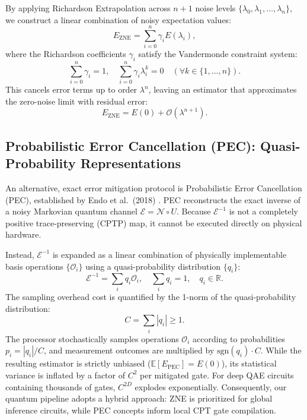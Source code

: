 By applying Richardson Extrapolation across $n+1$ noise levels $\{\lambda_0, \lambda_1, \dots, \lambda_n\}$, we construct a linear combination of noisy expectation values:
\begin{equation}
E_{\mathrm{ZNE}} = \sum_{i=0}^n \gamma_i E(\lambda_i),
\label{eq:zne_richardson_estimator}
\end{equation}
where the Richardson coefficients $\gamma_i$ satisfy the Vandermonde constraint system:
\begin{equation}
\sum_{i=0}^n \gamma_i = 1, \quad \sum_{i=0}^n \gamma_i \lambda_i^k = 0 \quad (\forall k \in \{1, \dots, n\}).
\label{eq:richardson_coefficients_ch3}
\end{equation}
This cancels error terms up to order $\lambda^n$, leaving an estimator that approximates the zero-noise limit with residual error:
\begin{equation}
E_{\mathrm{ZNE}} = E(0) + \mathcal{O}\left(\lambda^{n+1}\right).
\label{eq:zne_mitigated_estimator_ch3}
\end{equation}

\subsection{Probabilistic Error Cancellation (PEC): Quasi-Probability Representations}
An alternative, exact error mitigation protocol is Probabilistic Error Cancellation (PEC), established by Endo et al.~(2018) \cite{endo2018}. PEC reconstructs the exact inverse of a noisy Markovian quantum channel $\mathcal{E} = \mathcal{N} \circ U$. Because $\mathcal{E}^{-1}$ is not a completely positive trace-preserving (CPTP) map, it cannot be executed directly on physical hardware.

Instead, $\mathcal{E}^{-1}$ is expanded as a linear combination of physically implementable basis operations $\{\mathcal{O}_i\}$ using a quasi-probability distribution $\{q_i\}$:
\begin{equation}
\mathcal{E}^{-1} = \sum_i q_i \mathcal{O}_i, \quad \sum_i q_i = 1, \quad q_i \in \mathbb{R}.
\label{eq:pec_quasi_probability_expansion}
\end{equation}
The sampling overhead cost is quantified by the 1-norm of the quasi-probability distribution:
\begin{equation}
C = \sum_i |q_i| \ge 1.
\label{eq:pec_sampling_overhead_constant}
\end{equation}
The processor stochastically samples operations $\mathcal{O}_i$ according to probabilities $p_i = |q_i| / C$, and measurement outcomes are multiplied by $\mathrm{sgn}(q_i) \cdot C$. While the resulting estimator is strictly unbiased ($\mathbb{E}[E_{\mathrm{PEC}}] = E(0)$), its statistical variance is inflated by a factor of $C^2$ per mitigated gate. For deep QAE circuits containing thousands of gates, $C^{2D}$ explodes exponentially. Consequently, our quantum pipeline adopts a hybrid approach: ZNE is prioritized for global inference circuits, while PEC concepts inform local CPT gate compilation.

